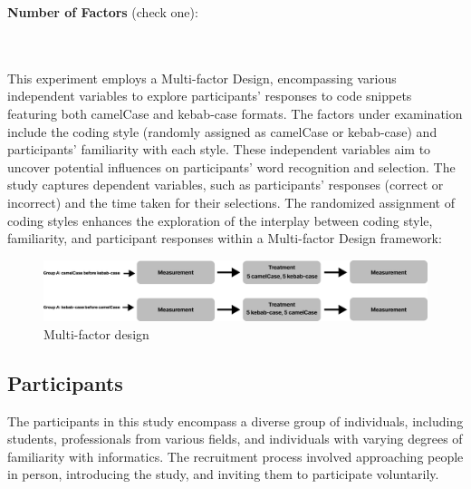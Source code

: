 \documentclass{article}
\begin{document}
\textbf{Number of Factors} (check one):\\
\noindent
\begin{minipage}{0.4\textwidth}
\end{minipage}%
\begin{minipage}{0.4\textwidth}
\end{minipage}%
\begin{minipage}{0.0\textwidth}
\end{minipage}\\\\
This experiment employs a Multi-factor Design, encompassing various independent variables to explore participants' responses to code snippets featuring both camelCase and kebab-case formats. The factors under examination include the coding style (randomly assigned as camelCase or kebab-case) and participants' familiarity with each style. These independent variables aim to uncover potential influences on participants' word recognition and selection. The study captures dependent variables, such as participants' responses (correct or incorrect) and the time taken for their selections. The randomized assignment of coding styles enhances the exploration of the interplay between coding style, familiarity, and participant responses within a Multi-factor Design framework:\\
\begin{figure}[H]
    \centering
    \includegraphics[width=1\textwidth]{graphExperiment2.png}
    \caption{Multi-factor design}
\end{figure}

\subsection{Participants}

The participants in this study encompass a diverse group of individuals, including students, professionals from various fields, and individuals with varying degrees of familiarity with informatics. The recruitment process involved approaching people in person, introducing the study, and inviting them to participate voluntarily.
\end{document}
